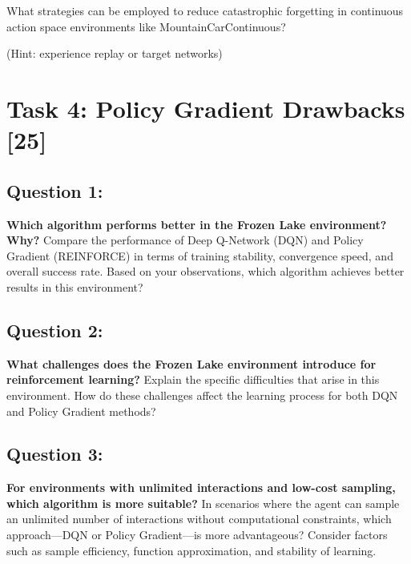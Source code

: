 \documentclass[12pt]{article}
\begin{document}
{{{What strategies can be employed to reduce catastrophic forgetting in continuous action space environments like MountainCarContinuous?

(Hint: experience replay or target networks)
\vspace*{0.3cm}

\newpage

\section{Task 4: Policy Gradient Drawbacks [25]}

\subsection{Question 1:}
\textbf{Which algorithm performs better in the Frozen Lake environment? Why?}
\newline
Compare the performance of Deep Q-Network (DQN) and Policy Gradient (REINFORCE) in terms of training stability, convergence speed, and overall success rate. Based on your observations, which algorithm achieves better results in this environment?

\subsection{Question 2:}
\textbf{ What challenges does the Frozen Lake environment introduce for reinforcement learning?}
\newline
Explain the specific difficulties that arise in this environment. How do these challenges affect the learning process for both DQN and Policy Gradient methods?

\subsection{Question 3:}
\textbf{For environments with unlimited interactions and low-cost sampling, which algorithm is more suitable?}
\newline
In scenarios where the agent can sample an unlimited number of interactions without computational constraints, which approach—DQN or Policy Gradient—is more advantageous? Consider factors such as sample efficiency, function approximation, and stability of learning.

}}



\newpage

{\selectfont {\color{DarkBlue}

}}}
\end{document}
